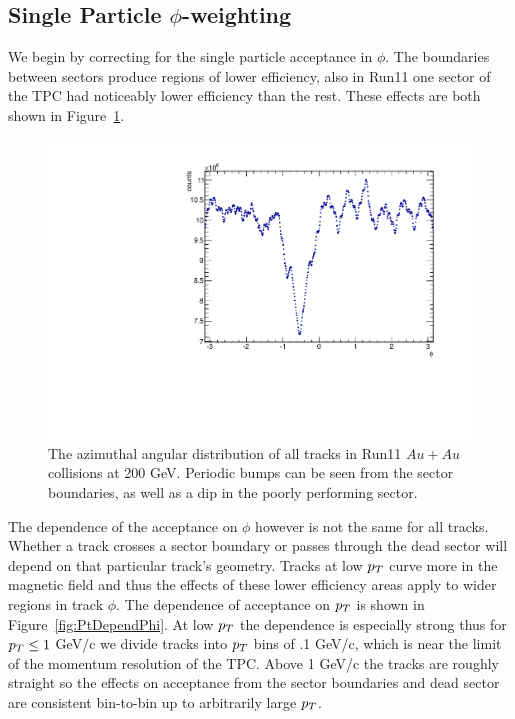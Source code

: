 \subsection{Single Particle $\phi$-weighting}

We begin by correcting for the single particle acceptance in $\phi$. The boundaries between sectors produce regions of lower efficiency, also in Run11 one sector of the TPC had noticeably lower efficiency than the rest. These effects are both shown in Figure~\ref{fig:PhiDistAllTracks}.  

\begin{figure}[htbp]
\begin{center}
\includegraphics[scale=.8]{Plots/Correlations/Phi_All.pdf}
\end{center}
\caption[Phi distribution for all tracks in TPC.]{The azimuthal angular distribution of all tracks in Run11 $Au+Au$ collisions at 200 GeV. Periodic bumps can be seen from the sector boundaries, as well as a dip in the poorly performing sector.}
\label{fig:PhiDistAllTracks}
\end{figure}

The dependence of the acceptance on $\phi$ however is not the same for all tracks. Whether a track crosses a sector boundary or passes through the dead sector will depend on that particular track's geometry. Tracks at low $p_{T}$ curve more in the magnetic field and thus the effects of these lower efficiency areas apply to wider regions in track $\phi$. The dependence of acceptance on $p_{T}$ is shown in Figure~\ref{fig:PtDependPhi}. At low $p_{T}$ the dependence is especially strong thus for $p_{T} \leq 1$ GeV/c we divide tracks into $p_{T}$ bins of .1 GeV/c, which is near the limit of the momentum resolution of the TPC. Above 1 GeV/c the tracks are roughly straight so the effects on acceptance from the sector boundaries and dead sector are consistent bin-to-bin up to arbitrarily large $p_{T}$.

